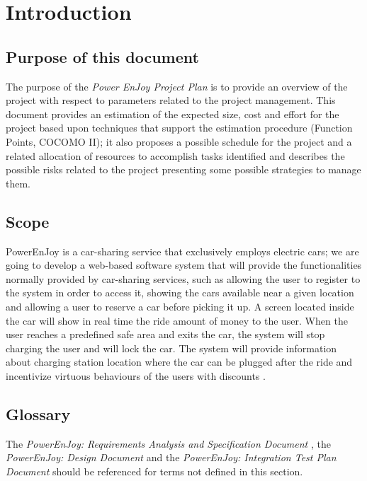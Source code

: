\section{Introduction}

\subsection{Purpose of this document}
The purpose of the \emph{Power EnJoy Project Plan} is to provide an overview of the project with respect to parameters related to the project management. This document provides an estimation of the expected size, cost and effort for the project based upon techniques that support the estimation
procedure (Function Points, COCOMO II); it also proposes a possible schedule for the project and a related allocation of resources to accomplish tasks identified and describes the possible risks related to the project presenting some possible strategies to manage them.


\subsection{Scope}
PowerEnJoy is a car-sharing service that exclusively employs electric cars; we are going to develop a web-based software system that will provide the functionalities normally provided by car-sharing services, such as allowing the user to register to the system in order to access it, showing the cars available near a given location and allowing a user to reserve a car before picking it up.
A screen located inside the car will show in real time the ride amount of money to the user. When the user reaches a predefined safe area and exits the car, the system will stop charging the user and will lock the car. The system will provide information about charging station location where the car can be plugged after the ride and incentivize virtuous behaviours of the users with discounts \cite{RASD}.

\subsection{Glossary}
The \emph{PowerEnJoy: Requirements Analysis and Specification Document} \cite{RASD}, the \emph{PowerEnJoy: Design Document} \cite{DD} and the \emph{PowerEnJoy: Integration Test Plan Document} \cite{ITPD} should be referenced for terms not defined in this section.

